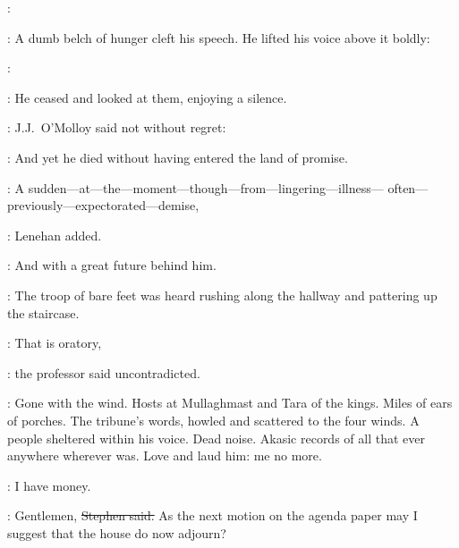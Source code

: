 \machugh:
\stage{[Taylor]}

:
A dumb belch of hunger cleft his speech.
He lifted his voice above it boldly:

\machugh:
\stage{[Taylor]}

:
He ceased and looked at them,
enjoying a silence.



:
J.J.~O'Molloy said
not without regret:

\jjom:
And yet he died
without having entered the land of promise.

\lenehan:
A sudden---at---the---moment---though---from---lingering---illness---%
often---previously---expectorated---demise,

:
Lenehan added.

\lenehan:
And with a great future behind him.

:
The troop of bare feet was heard rushing along the hallway
and pattering up the staircase.

\machugh:
That is oratory,

:
the professor said uncontradicted.

\machugh:
Gone with the wind.
Hosts at Mullaghmast and Tara of the kings.
Miles of ears of porches.
The tribune's words,
howled and scattered to the four winds.
A people sheltered within his voice.
Dead noise.
Akasic records of all that ever anywhere wherever was.
Love and laud him: me no more.

\StephenInt:
I have money.

\Stephen:
Gentlemen,
\sout{Stephen said.}
As the next motion on the agenda paper
may I suggest that the house do now adjourn?

